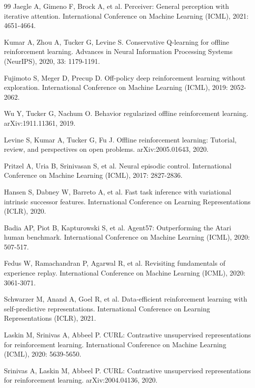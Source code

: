 \documentclass[12pt,a4paper]{ctexart}
\begin{document}
\begin{thebibliography}{99}
 Jaegle A, Gimeno F, Brock A, et al. Perceiver: General perception with iterative attention. International Conference on Machine Learning (ICML), 2021: 4651-4664.

 Kumar A, Zhou A, Tucker G, Levine S. Conservative Q-learning for offline reinforcement learning. Advances in Neural Information Processing Systems (NeurIPS), 2020, 33: 1179-1191.

 Fujimoto S, Meger D, Precup D. Off-policy deep reinforcement learning without exploration. International Conference on Machine Learning (ICML), 2019: 2052-2062.

 Wu Y, Tucker G, Nachum O. Behavior regularized offline reinforcement learning. arXiv:1911.11361, 2019.

 Levine S, Kumar A, Tucker G, Fu J. Offline reinforcement learning: Tutorial, review, and perspectives on open problems. arXiv:2005.01643, 2020.

 Pritzel A, Uria B, Srinivasan S, et al. Neural episodic control. International Conference on Machine Learning (ICML), 2017: 2827-2836.

 Hansen S, Dabney W, Barreto A, et al. Fast task inference with variational intrinsic successor features. International Conference on Learning Representations (ICLR), 2020.

 Badia AP, Piot B, Kapturowski S, et al. Agent57: Outperforming the Atari human benchmark. International Conference on Machine Learning (ICML), 2020: 507-517.

 Fedus W, Ramachandran P, Agarwal R, et al. Revisiting fundamentals of experience replay. International Conference on Machine Learning (ICML), 2020: 3061-3071.

 Schwarzer M, Anand A, Goel R, et al. Data-efficient reinforcement learning with self-predictive representations. International Conference on Learning Representations (ICLR), 2021.

 Laskin M, Srinivas A, Abbeel P. CURL: Contrastive unsupervised representations for reinforcement learning. International Conference on Machine Learning (ICML), 2020: 5639-5650.

 Srinivas A, Laskin M, Abbeel P. CURL: Contrastive unsupervised representations for reinforcement learning. arXiv:2004.04136, 2020.


\end{thebibliography}
\end{document}
